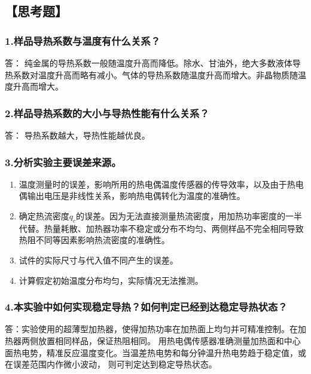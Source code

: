 \documentclass[10pt,a4paper,twocolumn,twoside,UTF8]{ctexart}
\begin{document}
	\subsection*{【思考题】}
	\subsubsection*{1.样品导热系数与温度有什么关系？}
	答： 纯金属的导热系数一般随温度升高而降低。除水、甘油外，绝大多数液体导热系数对温度升高而略有减小。气体的导热系数随温度升高而增大。非晶物质随温度升高而增大。

	\subsubsection*{2.样品导热系数的大小与导热性能有什么关系？}
	答： 导热系数越大，导热性能越优良。
	\subsubsection*{3.分析实验主要误差来源。}
\begin{enumerate}
	\item 温度测量时的误差，影响所用的热电偶温度传感器的传导效率，以及由于热电偶输出电压是非线性关系，影响热电偶转化为温度的准确性。
	\item 确定热流密度$q_c$的误差。因为无法直接测量热流密度，用加热功率密度的一半代替。热量耗散、加热器功率不稳定或分布不均匀、两侧样品不完全相同导致热阻不同等因素影响热流密度的准确性。
	\item 试件的实际尺寸与代入值不同产生的误差。
	\item 计算假定初始温度分布均匀，实际情况无法推测。
\end{enumerate}
    
\subsubsection*{4.本实验中如何实现稳定导热？如何判定已经到达稳定导热状态？}
答：实验使用的超薄型加热器，使得加热功率在加热面上均匀并可精准控制。在加热器两侧放置相同样品，保证热阻相同。
用热电偶传感器准确测量加热面和中心面热电势，精准反应温度变化。当温差热电势和每分钟温升热电势趋于稳定值，或在误差范围内作微小波动，
则可判定达到稳定导热状态。

\end{document}
